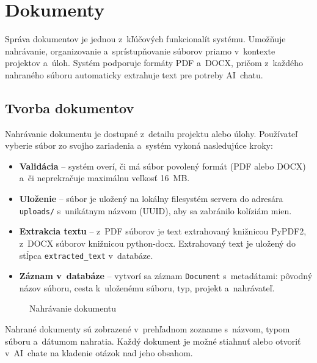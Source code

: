 \chapter{Dokumenty}

        Správa dokumentov je jednou z~kľúčových funkcionalít systému. Umožňuje
nahrávanie, organizovanie a~sprístupňovanie súborov priamo v~kontexte projektov
a~úloh. Systém podporuje formáty PDF a~DOCX, pričom z~každého nahraného súboru
automaticky extrahuje text pre potreby AI~chatu.

\section{Tvorba dokumentov}

        Nahrávanie dokumentu je dostupné z~detailu projektu alebo úlohy. Používateľ
vyberie súbor zo svojho zariadenia a~systém vykoná nasledujúce kroky:

\begin{itemize}
  \item \textbf{Validácia} -- systém overí, či má súbor povolený formát (PDF alebo DOCX)
        a~či neprekračuje maximálnu veľkosť 16~MB.
  \item \textbf{Uloženie} -- súbor je uložený na lokálny filesystém servera do adresára
        \texttt{uploads/} s~unikátnym názvom (UUID), aby sa zabránilo kolíziám mien.
  \item \textbf{Extrakcia textu} -- z~PDF súborov je text extrahovaný knižnicou
        PyPDF2, z~DOCX súborov knižnicou python-docx. Extrahovaný text je uložený
        do stĺpca \texttt{extracted\_text} v~databáze.
  \item \textbf{Záznam v~databáze} -- vytvorí sa záznam \texttt{Document} s~metadátami:
        pôvodný názov súboru, cesta k~uloženému súboru, typ, projekt a~nahrávateľ.
\end{itemize}

\begin{figure}[H]
  \centering
  \caption{Nahrávanie dokumentu}
  \label{fig:nahravanie}
\end{figure}

        Nahrané dokumenty sú zobrazené v~prehľadnom zozname s~názvom, typom súboru
a~dátumom nahratia. Každý dokument je možné stiahnuť alebo otvoriť v~AI~chate
na kladenie otázok nad jeho obsahom.

